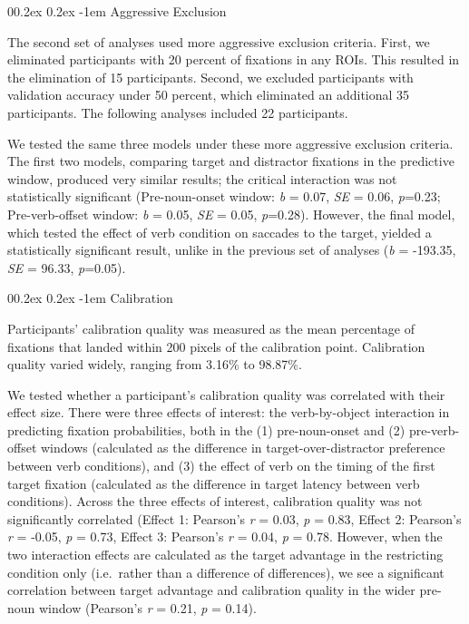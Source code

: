 \documentclass[
  man,floatsintext]{apa6}
\makeatletter
\let\oldparagraph\paragraph
\renewcommand{\paragraph}[1]{\oldparagraph{#1}\mbox{}}
\renewcommand{\paragraph}{\@startsection{paragraph}{4}{\parindent}%
  {0\baselineskip \@plus 0.2ex \@minus 0.2ex}%
  {-1em}%
  {\normalfont\normalsize\bfseries\itshape\typesectitle}}
\makeatother
\begin{document}
\hypertarget{aggressive-exclusion}{%
\paragraph{Aggressive Exclusion}\label{aggressive-exclusion}}

The second set of analyses used more aggressive exclusion criteria. First, we eliminated participants with 20 percent of fixations in any ROIs. This resulted in the elimination of 15 participants. Second, we excluded participants with validation accuracy under 50 percent, which eliminated an additional 35 participants. The following analyses included 22 participants.

We tested the same three models under these more aggressive exclusion criteria. The first two models, comparing target and distractor fixations in the predictive window, produced very similar results; the critical interaction was not statistically significant (Pre-noun-onset window: \emph{b} = 0.07, \emph{SE} = 0.06, \emph{p}=0.23; Pre-verb-offset window: \emph{b} = 0.05, \emph{SE} = 0.05, \emph{p}=0.28). However, the final model, which tested the effect of verb condition on saccades to the target, yielded a statistically significant result, unlike in the previous set of analyses (\emph{b} = -193.35, \emph{SE} = 96.33, \emph{p}=0.05).

\hypertarget{calibration}{%
\paragraph{Calibration}\label{calibration}}

Participants' calibration quality was measured as the mean percentage of fixations that landed within 200 pixels of the calibration point. Calibration quality varied widely, ranging from 3.16\% to 98.87\%.

We tested whether a participant's calibration quality was correlated with their effect size. There were three effects of interest: the verb-by-object interaction in predicting fixation probabilities, both in the (1) pre-noun-onset and (2) pre-verb-offset windows (calculated as the difference in target-over-distractor preference between verb conditions), and (3) the effect of verb on the timing of the first target fixation (calculated as the difference in target latency between verb conditions). Across the three effects of interest, calibration quality was not significantly correlated (Effect 1: Pearson's \emph{r} = 0.03, \emph{p} = 0.83, Effect 2: Pearson's \emph{r} = -0.05, \emph{p} = 0.73, Effect 3: Pearson's \emph{r} = 0.04, \emph{p} = 0.78. However, when the two interaction effects are calculated as the target advantage in the restricting condition only (i.e.~rather than a difference of differences), we see a significant correlation between target advantage and calibration quality in the wider pre-noun window (Pearson's \emph{r} = 0.21, \emph{p} = 0.14).
\end{document}
